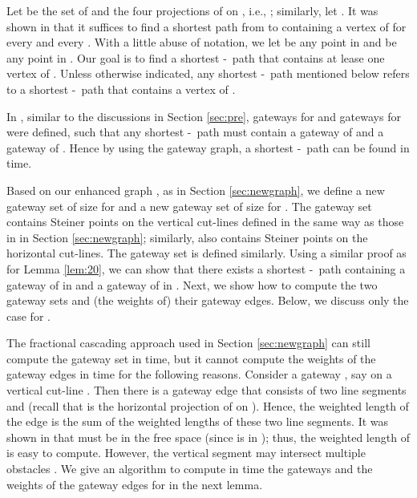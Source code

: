\documentclass[english,runningheads,11pt]{llncs}
\def\st{-}
\begin{document}
Let  be the set of  and
the four projections of  on , i.e., ;
similarly, let . It was shown in
\cite{ref:ChenSh00} that it suffices to find a shortest path
from  to  containing a vertex of  for every  and every .
With a little abuse of notation,
we let  be any point in  and  be any point in . Our
goal is to find a shortest \st\ path that contains at lease one vertex of .
Unless otherwise indicated, any shortest \st\ path
mentioned below refers to a shortest \st\ path that contains a vertex of .

In \cite{ref:ChenSh00}, similar to the discussions in Section \ref{sec:pre},
 gateways for  and  gateways for  were defined,
such that any shortest \st\ path must contain a gateway of  and a
gateway of . Hence by using the gateway graph, a shortest \st\ path can be
found in  time.


Based on our enhanced graph , as in Section \ref{sec:newgraph},
we define a new gateway set  of size  for
 and a new gateway set  of size  for .
The gateway set  contains   Steiner points on the
vertical cut-lines defined in the same way as those in  in Section \ref{sec:newgraph}; similarly,  also contains   Steiner points on the
horizontal cut-lines.  The gateway set  is defined similarly.
Using a similar proof as for Lemma \ref{lem:20}, we can show that
there exists a shortest \st\ path containing a gateway of  in  and a
gateway of  in . Next, we show how to compute the two gateway sets and
(the weights of) their gateway edges. Below, we discuss only the case for .

The fractional cascading approach \cite{ref:ChazelleFr86} used in
Section \ref{sec:newgraph} can still compute the gateway
set  in  time, but it cannot compute the weights of the
gateway edges in  time for the following reasons.
Consider a gateway , say on a vertical cut-line . Then
there is a gateway edge  that consists of two line segments
 and  (recall that  is the horizontal projection of  on ). Hence, the weighted length
of the edge  is the sum of the weighted lengths of these two line segments.
It was shown in \cite{ref:ChenSh00} that  must be in the free
space (since  is in ); thus, the weighted length of
 is easy to compute. However, the vertical segment
 may intersect multiple
obstacles \cite{ref:ChenSh00}. We give an algorithm to compute in
 time the gateways and the weights of the
gateway edges for  in the next lemma.
\end{document}
